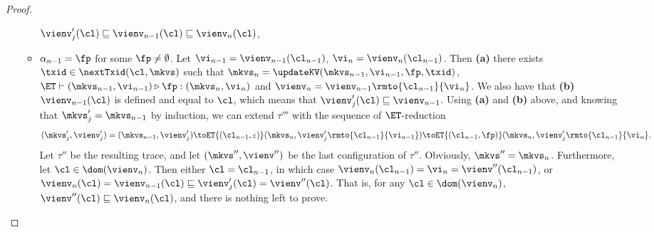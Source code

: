 \begin{proof}
\begin{itemize}
\begin{itemize}
$\vienv'_{j}(\cl) \sqsubseteq \vienv_{n-1}(\cl) \sqsubseteq \vienv_{n}(\cl)$, 
\item $\alpha_{n-1} = \fp$ for some $\fp \neq \emptyset$. 
Let $\vi_{n-1} = \vienv_{n-1}(\cl_{n-1})$, $\vi_{n} = \vienv_{n}(\cl_{n-1})$. Then \textbf{(a)} there exists $\txid \in \nextTxid(\cl, \mkvs)$ 
such that $\mkvs_{n} = \updateKV(\mkvs_{n-1}, \vi_{n-1}, \fp, \txid)$, $\ET \vdash (\mkvs_{n-1}, \vi_{n-1}) \triangleright \fp: (\mkvs_{n}, \vi_{n})$ 
and $\vienv_{n} = \vienv_{n-1}\rmto{\cl_{n-1}}{\vi_{n}}$. 
We also have that \textbf{(b)} $\vienv_{n-1}(\cl)$ is defined and equal to $\cl$, which means that $\vienv'_{j}(\cl) \sqsubseteq \vienv_{n-1}$. 
Using \textbf{(a)} and \textbf{(b)} above, and knowing that $\mkvs'_{j} = \mkvs_{n-1}$ by induction,   we can extend 
$\tau'''$ with the sequence of $\ET$-reduction 
\[ (\mkvs'_{j}, \vienv'_{j}) = (\mkvs_{n-1}, \vienv'_{j}) 
 \toET{(\cl_{n-1}, \varepsilon)} (\mkvs_{n}, \vienv'_{j}\rmto{\cl_{n-1}}{\vi_{n-1}}) \toET{(\cl_{n-1}, \fp)} (\mkvs_{n}, \vienv'_{j}\rmto{\cl_{n-1}}{\vi_{n}}.
 \]
Let $\tau''$ be the resulting trace, and let $(\mkvs'', \vienv'')$ be the last configuration of $\tau''$. 
Obviously, $\mkvs'' = \mkvs_{n}$. Furthermore, let $\cl \in \dom(\vienv_{n})$. Then either $\cl = \cl_{n-1}$, 
in which case $\vienv_{n}(\cl_{n-1}) = \vi_{n} = \vienv''(\cl_{n-1})$, or 
$\vienv_{n}(\cl) = \vienv_{n-1}(\cl) \sqsubseteq \vienv'_{j}(\cl) = \vienv''(\cl)$. That is, for any $\cl \in \dom(\vienv_{n})$, 
$\vienv''(\cl) \sqsubseteq \vienv_{n}(\cl)$, and there is nothing left to prove.
\end{itemize}

\end{itemize}

\end{proof}



